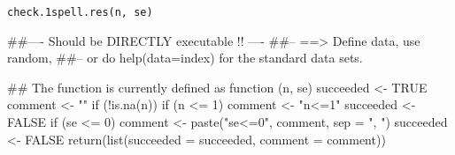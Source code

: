 \begin{Usage}
\begin{verbatim}
check.1spell.res(n, se)
\end{verbatim}
\end{Usage}
\begin{Arguments}
\begin{ldescription}
\item[\code{n}] 
\item[\code{se}] 
\end{ldescription}
\end{Arguments}
\begin{Examples}
\begin{ExampleCode}
##---- Should be DIRECTLY executable !! ----
##-- ==>  Define data, use random,
##--    or do  help(data=index)  for the standard data sets.

## The function is currently defined as
function (n, se) 
{
    succeeded <- TRUE
    comment <- ""
    if (!is.na(n)) {
        if (n <= 1) {
            comment <- "n<=1"
            succeeded <- FALSE
        }
    }
    if (se <= 0) {
        comment <- paste("se<=0", comment, sep = ", ")
        succeeded <- FALSE
    }
    return(list(succeeded = succeeded, comment = comment))
  }
\end{ExampleCode}
\end{Examples}

